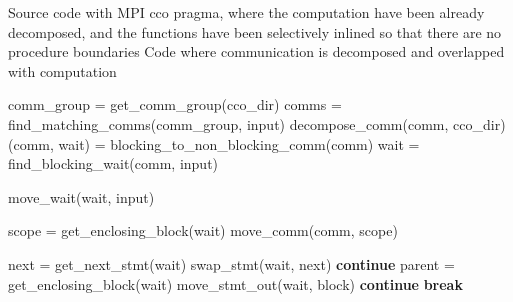 
\begin{algorithm}
{\scriptsize
\begin{algorithmic}
\Require Source code with MPI cco pragma,
\State where the computation have been already decomposed, and
\State the functions have been selectively inlined so that there are no procedure boundaries
\Ensure Code where communication is decomposed and overlapped with computation

  \State comm\_group = get\_comm\_group(cco\_dir) %
  \State comms = find\_matching\_comms(comm\_group, input) %
      \State decompose\_comm(comm, cco\_dir) %
    \EndIf
      \State (comm, wait) = blocking\_to\_non\_blocking\_comm(comm) %
    \Else
      \State wait = find\_blocking\_wait(comm, input) %
    \EndIf

    \State move\_wait(wait, input)  %

    \State scope = get\_enclosing\_block(wait) %
    \State move\_comm(comm, scope)  %
  \EndFor
\EndFunction

      \State next = get\_next\_stmt(wait) %
        \State swap\_stmt(wait, next) %
        \State \textbf{continue}
      \EndIf
    \EndIf
      \State parent = get\_enclosing\_block(wait)
        \State move\_stmt\_out(wait, block) %
      \EndIf
      \State \textbf{continue}
    \EndIf
    \State \textbf{break}
  \EndWhile
\EndFunction


\end{algorithmic}}
\end{algorithm}
